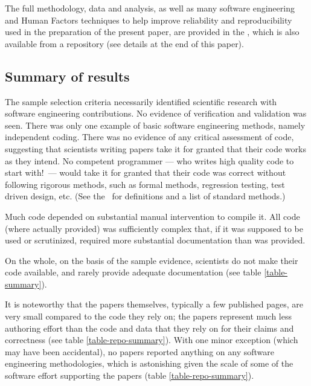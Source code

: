 The full methodology, data and analysis, as well as many software engineering and Human Factors techniques to help improve reliability and reproducibility used in the preparation of the present paper, are provided in the \supplement, which is also available from a repository (see details at the end of this paper).


\subsection{Summary of results}
The sample selection criteria necessarily identified scientific research with software engineering contributions. No evidence of verification and validation was seen. There was only one example of basic software engineering methods, namely independent coding. There was no evidence of any critical assessment of code, suggesting that scientists writing papers take it for granted that their code works as they intend. No competent programmer --- who writes high quality code to start with!\ --- would take it for granted that their code was correct without following rigorous methods, such as formal methods, regression testing, test driven design, etc. (See the \supplement\ for definitions and a list of standard methods.)

Much code depended on substantial manual intervention to compile it. All code (where actually provided) was sufficiently complex that, if it was supposed to be used or scrutinized, required more substantial documentation than was provided.

On the whole, on the basis of the sample evidence, scientists do not make their code available, and rarely provide adequate documentation (see table \ref{table-summary}). 

It is noteworthy that the papers themselves, typically a few published pages, are very small compared to the code they rely on; the papers represent much less authoring effort than the code and data that they rely on for their claims and correctness (see table \ref{table-repo-summary}). With one minor exception (which may have been accidental), no papers reported anything on any software engineering methodologies, which is astonishing given the scale of some of the software effort supporting the papers (table \ref{table-repo-summary}). 

